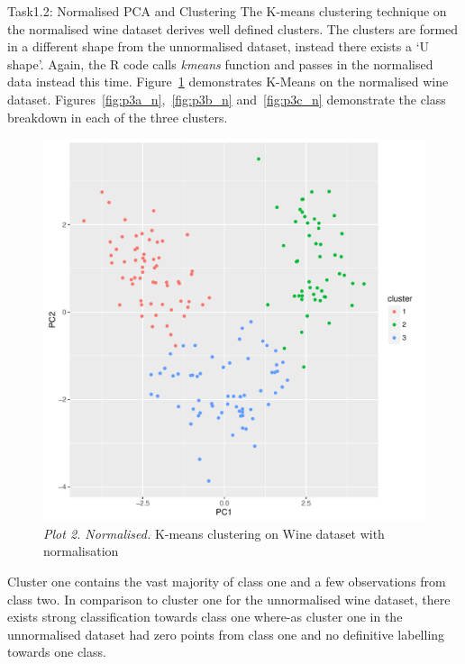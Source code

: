 \documentclass[11pt]{article}
\begin{document}
\begin{subsection}{Task1.2: Normalised PCA and Clustering}
The K-means clustering technique on the normalised wine dataset derives well defined clusters. The clusters are formed in a different shape from the unnormalised dataset, instead there exists a `U shape'. Again, the R code calls \textit{kmeans} function and passes in the normalised data instead this time. Figure~\ref{fig:kmeans_norm} demonstrates K-Means on the normalised wine dataset. Figures~\ref{fig:p3a_n},~\ref{fig:p3b_n} and~\ref{fig:p3c_n} demonstrate the class breakdown in each of the three clusters.
\begin{figure}[H]
    \centering
    \includegraphics[width=1.0\textwidth]{p2_n}
    \caption{\textit{Plot 2. Normalised.} K-means clustering on Wine dataset with normalisation}
    \label{fig:kmeans_norm}
\end{figure}
\pagebreak Cluster one contains the vast majority of class one and a few observations from class two. In comparison to cluster one for the unnormalised wine dataset, there exists strong classification towards class one where-as cluster one in the unnormalised dataset had zero points from class one and no definitive labelling towards one class.
\begin{figure}[H]
    \centering

\end{figure}
\end{subsection}
\end{document}
